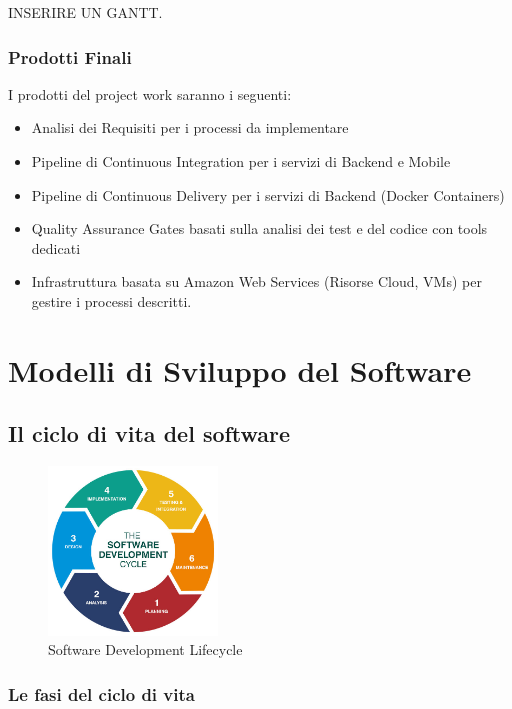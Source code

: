 \documentclass[a4paper,12pt]{report}
\begin{document}
			INSERIRE UN GANTT.
	
		\subsection{Prodotti Finali}
		
			I prodotti del project work saranno i seguenti:
			\begin{itemize}
				\item Analisi dei Requisiti per i processi da implementare
				\item Pipeline di Continuous Integration per i servizi di Backend e Mobile
				\item Pipeline di Continuous Delivery per i servizi di Backend (Docker Containers)
				\item Quality Assurance Gates basati sulla analisi dei test e del codice con tools dedicati
				\item Infrastruttura basata su Amazon Web Services (Risorse Cloud, VMs) per gestire i processi descritti.
			\end{itemize}
	
	\chapter{Modelli di Sviluppo del Software}
	
		\section{Il ciclo di vita del software}
	
			\begin{figure}[h]
				\centering
				\includegraphics[width=0.4\textwidth]{sdlc}
				\caption{Software Development Lifecycle}
				\label{fig:sdlc}
			\end{figure}
	
			\subsection{Le fasi del ciclo di vita}
	
\end{document}
